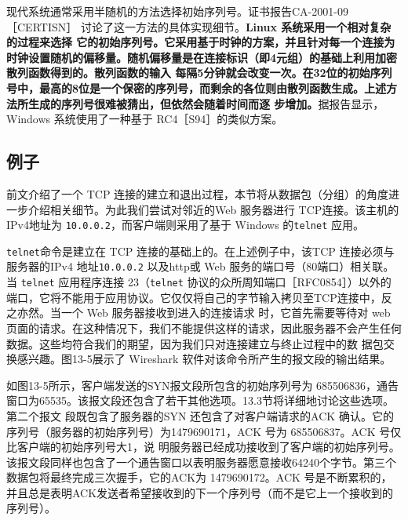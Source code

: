 现代系统通常采用半随机的方法选择初始序列号。证书报告CA-2001-09 ［CERTISN］ 讨论了这一方法的具体实现细节。\textbf{Linux 系统采用一个相对复杂的过程来选择
它的初始序列号\footnotemark。它采用基于时钟的方案，并且针对每一个连接为时钟设置随机的偏移量。随机偏移量是在连接标识（即4元组）的基础上利用加密散列函数得到的。散列函数的输入
每隔5分钟就会改变一次。在32位的初始序列号中，最高的8位是一个保密的序列号，而剩余的各位则由散列函数生成。上述方法所生成的序列号很难被猜出，但依然会随着时间而逐
步增加。}据报告显示，Windows 系统使用了一种基于 RC4［S94］的类似方案。
\subsection{例子}
前文介绍了一个 TCP 连接的建立和退出过程，本节将从数据包（分组）的角度进一步介绍相关细节。为此我们尝试对邻近的Web 服务器进行 TCP连接。该主机的IPv4地址为
\verb|10.0.0.2|，而客户端则采用了基于 Windows 的\verb|telnet| 应用。

\verb|telnet|命令是建立在 TCP 连接的基础上的。在上述例子中，该TCP 连接必须与服务器的IPv4 地址\verb|10.0.0.2| 以及http或 Web 服务的端口号（80端口）相关联。当 \verb|telnet| 应用程序连接
23（\verb|telnet| 协议的众所周知端口［RFC0854］）以外的端口，它将不能用于应用协议。它仅仅将自己的字节输入拷贝至TCP连接中，反之亦然。当一个 Web 服务器接收到进入的连接请求
时，它首先需要等待对 web 页面的请求。在这种情况下，我们不能提供这样的请求，因此服务器不会产生任何数据。这些均符合我们的期望，因为我们只对连接建立与终止过程中的数
据包交换感兴趣。图13-5展示了 Wireshark 软件对该命令所产生的报文段的输出结果。

如图13-5所示，客户端发送的SYN报文段所包含的初始序列号为 685506836，通告窗口为65535。该报文段还包含了若干其他选项。13.3节将详细地讨论这些选项。第二个报文
段既包含了服务器的SYN 还包含了对客户端请求的ACK 确认。它的序列号（服务器的初始序列号）为1479690171，ACK 号为 685506837。ACK 号仅比客户端的初始序列号大1，说
明服务器已经成功接收到了客户端的初始序列号。该报文段同样也包含了一个通告窗口以表明服务器愿意接收64240个字节。第三个数据包将最终完成三次握手，它的ACK为
1479690172。ACK 号是不断累积的，并且总是表明ACK发送者希望接收到的下一个序列号（而不是它上一个接收到的序列号）。

